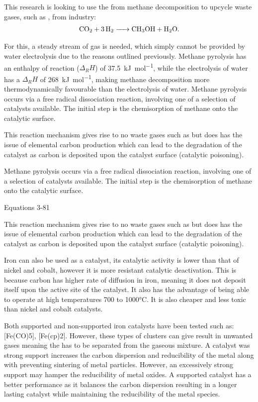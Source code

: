 This research is looking to use the  from methane decomposition to upcycle waste gases, such as , from industry:
\begin{align}
	\ce{CO2 + 3H2 -> CH3OH + H2O}
.\end{align}

For this, a steady stream of  gas is needed, which simply cannot be provided by water electrolysis due to the reasons outlined previously.
Methane pyrolysis has an enthalpy of reaction ($\Delta_RH$) of \SI{+37.5}{\kilo\joule\per\mole}, while the electrolysis of water has a $\Delta_RH$ of \SI{+268}{\kilo\joule\per\mole}, making methane decomposition more thermodynamically favourable than the electrolysis of water.
Methane pyrolysis occurs via a free radical dissociation reaction, involving one of a selection of catalysts available.
The initial step is the chemisorption of methane onto the catalytic surface.


This reaction mechanism gives rise to no waste gases such as  but does has the issue of elemental carbon production which can lead to the degradation of the catalyst as carbon is deposited upon the catalyst surface (catalytic poisoning).

Methane pyrolysis occurs via a free radical dissociation reaction, involving one of a selection of catalysts available.
The initial step is the chemisorption of methane onto the catalytic surface.

Equations 3-81

This reaction mechanism gives rise to no waste gases such as  but does has the issue of elemental carbon production which can lead to the degradation of the catalyst as carbon is deposited upon the catalyst surface (catalytic poisoning).


Iron can also be used as a catalyst, its catalytic activity is lower than that of nickel and cobalt, however it is more resistant catalytic deactivation.
This is because carbon has higher rate of diffusion in iron, meaning it does not deposit itself upon the active site of the catalyst.
It also has the advantage of being able to operate at high temperatures 700 to 1000°C.
It is also cheaper and less toxic than nickel and cobalt catalysts.

Both supported and non-supported iron catalysts have been tested such as: [Fe(CO)5], [Fe(cp)2].
However, these types of clusters can give result in unwanted gases meaning the  has to be separated from the gaseous mixture.
A catalyst was strong support increases the carbon dispersion and reducibility of the metal along with preventing sintering of metal particles.
However, an excessively strong support may hamper the reducibility of metal oxides.
A supported catalyst has a better performance as it balances the carbon dispersion resulting in a longer lasting catalyst while maintaining the reducibility of the metal species.

